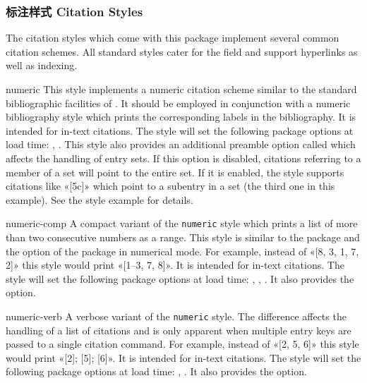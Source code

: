 \subsubsection{标注样式 Citation Styles}
\label{use:xbx:cbx}

The citation styles which come with this package implement several common citation schemes. All standard styles cater for the  field and support hyperlinks as well as indexing.

\begin{marglist}

\item[numeric]
This style implements a numeric citation scheme similar to the standard bibliographic facilities of \latex. It should be employed in conjunction with a numeric bibliography style which prints the corresponding labels in the bibliography. It is intended for in-text citations. The style will set the following package options at load time: , . This style also provides an additional preamble option called  which affects the handling of entry sets. If this option is disabled, citations referring to a member of a set will point to the entire set. If it is enabled, the style supports citations like «[5c]» which point to a subentry in a set (the third one in this example). See the style example for details.

\item[numeric-comp]
A compact variant of the \texttt{numeric} style which prints a list of more than two consecutive numbers as a range. This style is similar to the  package and the  option of the  package in numerical mode. For example, instead of «[8, 3, 1, 7, 2]» this style would print «[1--3, 7, 8]». It is intended for in-text citations. The style will set the following package options at load time: , , . It also provides the  option.

\item[numeric-verb]
A verbose variant of the \texttt{numeric} style. The difference affects the handling of a list of citations and is only apparent when multiple entry keys are passed to a single citation command. For example, instead of «[2, 5, 6]» this style would print «[2]; [5]; [6]». It is intended for in-text citations. The style will set the following package options at load time: , . It also provides the  option.


\end{marglist}
